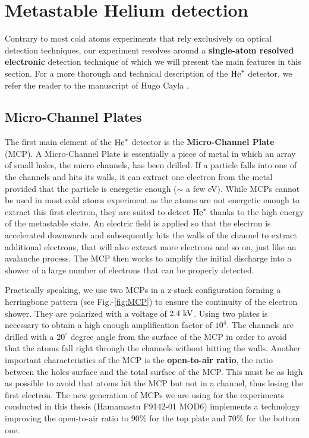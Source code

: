 \section{Metastable Helium detection}


Contrary to most cold atoms experiments that rely exclusively on optical detection techniques, our experiment revolves around a \textbf{single-atom resolved} \textbf{electronic} detection technique of which we will present the main features in this section. For a more thorough and technical description of the $\mathrm{He}^*$ detector, we refer the reader to the manuscript of Hugo Cayla \cite{cayla_these}.

\subsection{Micro-Channel Plates}

The first main element of the $\mathrm{He}^*$ detector is the \textbf{Micro-Channel Plate} (MCP). A Micro-Channel Plate is essentially a piece of metal in which an array of small holes, the micro channels, has been drilled. If a particle falls into one of the channels and hits its walls, it can extract one electron from the metal provided that the particle is energetic enough ($\sim$ a few eV). While MCPs cannot be used in most cold atoms experiment as the atoms are not energetic enough to extract this first electron, they are suited to detect $\mathrm{He}^*$ thanks to the high energy of the metastable state. An electric field is applied so that the electron is accelerated downwards and subsequently hits the walls of the channel to extract additional electrons, that will also extract more electrons and so on, just like an avalanche process. The MCP then works to amplify the initial discharge into a shower of a large number of electrons that can be properly detected. 

Practically speaking, we use two MCPs in a z-stack configuration forming a herringbone pattern (see Fig.-\ref{fig:MCP}) to ensure the continuity of the electron shower. They are polarized with a voltage of $2.4 \ \rm{kV}$. Using two plates is necessary to obtain a high enough amplification factor of $10^4$. The channels are drilled with a $20^{\circ}$ degree angle from the surface of the MCP in order to avoid that the atoms fall right through the channels without hitting the walls. Another important characteristics of the MCP is the \textbf{open-to-air ratio}, \ie the ratio between the holes surface and the total surface of the MCP. This must be as high as possible to avoid that atoms hit the MCP but not in a channel, thus losing the first electron. The new generation of MCPs we are using for the experiments conducted in this thesis (Hamamastu F9142-01 MOD6) implements a technology improving the open-to-air ratio to $90\%$ for the top plate and $70 \%$ for the bottom one.

